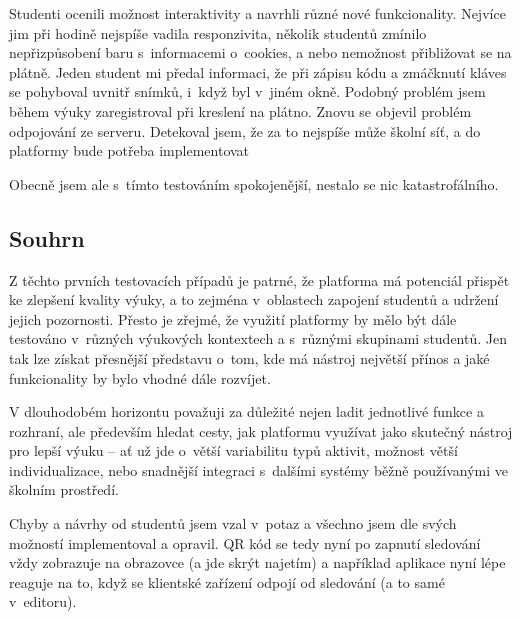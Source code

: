 Studenti ocenili možnost interaktivity a navrhli různé nové funkcionality.
Nejvíce jim při hodině nejspíše vadila responzivita, několik studentů zmínilo nepřizpůsobení baru s~informacemi o~cookies, a nebo nemožnost přibližovat se na plátně.
Jeden student mi předal informaci, že při zápisu kódu a zmáčknutí kláves se pohyboval uvnitř snímků, i~když byl v~jiném okně.
Podobný problém jsem během výuky zaregistroval při kreslení na plátno.
Znovu se objevil problém odpojování ze serveru.
Detekoval jsem, že za to nejspíše může školní síť, a do platformy bude potřeba implementovat 

Obecně jsem ale s~tímto testováním spokojenější, nestalo se nic katastrofálního.

\subsection{Souhrn}

Z těchto prvních testovacích případů je patrné, že platforma má potenciál přispět ke zlepšení kvality výuky, a to zejména v~oblastech zapojení studentů a udržení jejich pozornosti. 
Přesto je zřejmé, že využití platformy by mělo být dále testováno v~různých výukových kontextech a s~různými skupinami studentů. 
Jen tak lze získat přesnější představu o~tom, kde má nástroj největší přínos a jaké funkcionality by bylo vhodné dále rozvíjet.

V dlouhodobém horizontu považuji za důležité nejen ladit jednotlivé funkce a rozhraní, ale především hledat cesty, jak platformu využívat jako skutečný nástroj pro lepší výuku -- ať už jde o~větší variabilitu typů aktivit, možnost větší individualizace, nebo snadnější integraci s~dalšími systémy běžně používanými ve školním prostředí.

Chyby a návrhy od studentů jsem vzal v~potaz a všechno jsem dle svých možností implementoval a opravil.
QR kód se tedy nyní po zapnutí sledování vždy zobrazuje na obrazovce (a jde skrýt najetím) a například aplikace nyní lépe reaguje na to, když se klientské zařízení odpojí od sledování (a to samé v~editoru).